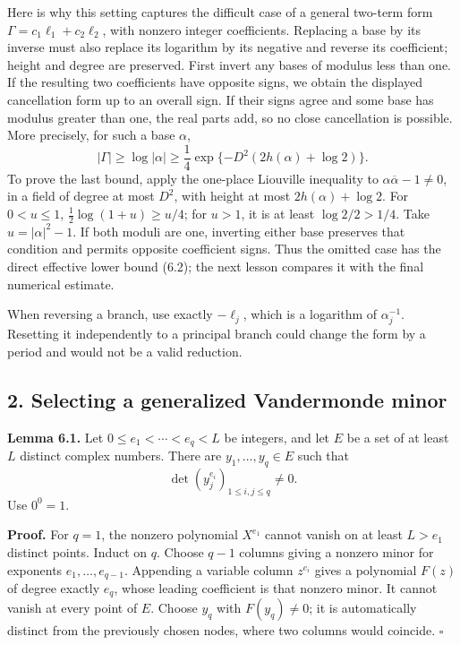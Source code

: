 \documentclass[
  11pt,
  a4paper,
]{article}
\begin{document}
Here is why this setting captures the difficult case of a general
two-term form \(\Gamma=c_1\ell_1+c_2\ell_2\), with nonzero integer
coefficients. Replacing a base by its inverse must also replace its
logarithm by its negative and reverse its coefficient; height and degree
are preserved. First invert any bases of modulus less than one. If the
resulting two coefficients have opposite signs, we obtain the displayed
cancellation form up to an overall sign. If their signs agree and some
base has modulus greater than one, the real parts add, so no close
cancellation is possible. More precisely, for such a base \(\alpha\), \[
|\Gamma|\ge\log|\alpha|
\ge\frac14\exp\{-D^2(2h(\alpha)+\log2)\}. \tag{6.2}
\] To prove the last bound, apply the one-place Liouville inequality to
\(\alpha\overline\alpha-1\ne0\), in a field of degree at most \(D^2\),
with height at most \(2h(\alpha)+\log2\). For \(0<u\le1\),
\(\tfrac12\log(1+u)\ge u/4\); for \(u>1\), it is at least
\(\log2/2>1/4\). Take \(u=|\alpha|^2-1\). If both moduli are one,
inverting either base preserves that condition and permits opposite
coefficient signs. Thus the omitted case has the direct effective lower
bound (6.2); the next lesson compares it with the final numerical
estimate.

When reversing a branch, use exactly \(-\ell_j\), which is a logarithm
of \(\alpha_j^{-1}\). Resetting it independently to a principal branch
could change the form by a period and would not be a valid reduction.

\subsection{2. Selecting a generalized Vandermonde
minor}\label{selecting-a-generalized-vandermonde-minor}

\textbf{Lemma 6.1.} Let \(0\le e_1<\cdots<e_q<L\) be integers, and let
\(E\) be a set of at least \(L\) distinct complex numbers. There are
\(y_1,\ldots,y_q\in E\) such that \[
\det(y_j^{e_i})_{1\le i,j\le q}\ne0. \tag{6.3}
\] Use \(0^0=1\).

\textbf{Proof.} For \(q=1\), the nonzero polynomial \(X^{e_1}\) cannot
vanish on at least \(L>e_1\) distinct points. Induct on \(q\). Choose
\(q-1\) columns giving a nonzero minor for exponents
\(e_1,\ldots,e_{q-1}\). Appending a variable column \(z^{e_i}\) gives a
polynomial \(F(z)\) of degree exactly \(e_q\), whose leading coefficient
is that nonzero minor. It cannot vanish at every point of \(E\). Choose
\(y_q\) with \(F(y_q)\ne0\); it is automatically distinct from the
previously chosen nodes, where two columns would coincide. \(\square\)
\end{document}
